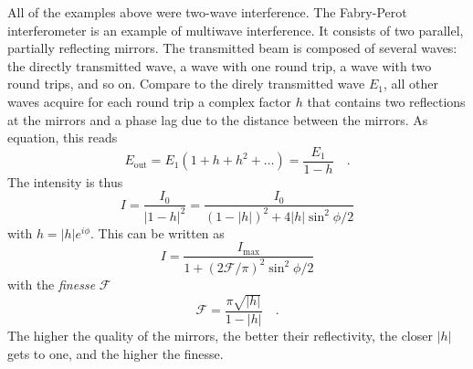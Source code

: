 All of the examples above were two-wave interference. The Fabry-Perot interferometer is an example of multiwave interference. It consists of two parallel, partially reflecting mirrors. The transmitted beam is composed of several waves: the directly transmitted wave, a wave with one round trip, a wave with two round trips, and so on. Compare to the direly transmitted wave $E_1$, all other waves acquire for each round trip a complex factor $h$ that contains two reflections at the mirrors and a phase lag due to the distance between the mirrors.
As equation, this reads
\begin{equation}
  E_\text{out} = E_1 \left( 1 + h + h^2 + \dots  \right) = \frac{ E_1 }{1 - h}  \quad . \label{eq:6_FP_Eout}
\end{equation}
The intensity is thus
\begin{equation}
  I = \frac{I_0}{| 1 - h |^2} = \frac{I_0}{(1 - |h|)^2 + 4 |h| \sin^2 \phi/2}
\end{equation}
with $h = |h| e^{i \phi}$. This can be written as
\begin{equation}
  I = \frac{I_\text{max}}{1 + (2 \mathcal{F}/ \pi)^2  \sin^2 \phi/2}
\end{equation}
with the \emph{finesse} $\mathcal{F}$
\begin{equation}
  \mathcal{F} = \frac{\pi \sqrt{|h|}}{1 - |h|}  \quad .
\end{equation}
The higher the quality of the mirrors, the better their reflectivity, the closer $|h|$ gets to one, and the higher the finesse.

